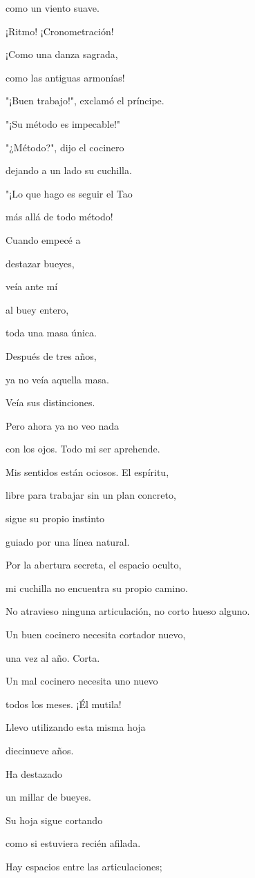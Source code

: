 como un viento suave.

¡Ritmo! ¡Cronometración!

¡Como una danza sagrada,

como las antiguas armonías!

"¡Buen trabajo!", exclamó el príncipe.

"¡Su método es impecable!"

"¿Método?", dijo el cocinero

dejando a un lado su cuchilla.

"¡Lo que hago es seguir el Tao

más allá de todo método!

Cuando empecé a

destazar bueyes,

veía ante mí

al buey entero,

toda una masa única.

Después de tres años,

ya no veía aquella masa.

Veía sus distinciones.

Pero ahora ya no veo nada

con los ojos. Todo mi ser aprehende.

Mis sentidos están ociosos. El espíritu,

libre para trabajar sin un plan concreto,

sigue su propio instinto

guiado por una línea natural.

Por la abertura secreta, el espacio oculto,

mi cuchilla no encuentra su propio camino.

No atravieso ninguna articulación, no corto hueso alguno.

Un buen cocinero necesita cortador nuevo,

una vez al año. Corta.

Un mal cocinero necesita uno nuevo

todos los meses. ¡Él mutila!

Llevo utilizando esta misma hoja

diecinueve años.

Ha destazado

un millar de bueyes.

Su hoja sigue cortando

como si estuviera recién afilada.

Hay espacios entre las articulaciones;

